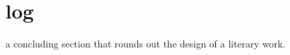 \chapter{log}

\begin{vocabulary}[dialogue]
\end{vocabulary}

\begin{vocabulary}[monologue]
\end{vocabulary}

\begin{vocabulary}[prologue]
\end{vocabulary}

\begin{vocabulary}[epilogue]
    a concluding section that rounds out the design of a literary work.
\end{vocabulary}